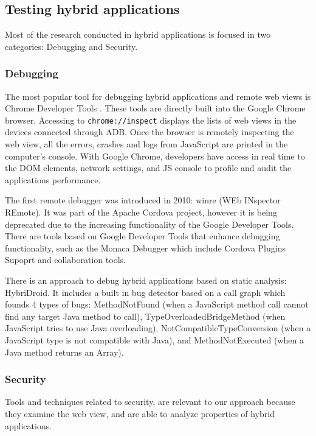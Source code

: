\subsection{Testing  hybrid applications}

Most of the research conducted in hybrid applications is focused in two categories: Debugging and Security.

\subsubsection{Debugging}

The most popular tool for debugging hybrid applications and remote web views is Chrome Developer Tools \cite{cdt}. These tools are directly built into the Google Chrome browser. Accessing to \texttt{chrome://inspect} displays the lists of web views in the devices connected through ADB. Once the browser is remotely inspecting the web view, all the errors, crashes and logs from JavaScript are printed in the computer's console. With Google Chrome, developers have access in real time to the DOM elements, network settings, and JS console to profile and audit the applications performance.

The first remote debugger was introduced in 2010: winre (WEb INspector REmote)\cite{weinre}. It was part of the Apache Cordova project, however it is being deprecated due to the increasing functionality of the Google Developer Tools. There are tools based on Google Developer Tools that enhance debugging functionality, such as the Monaca Debugger\cite{monacaDebugger} which include Cordova Plugins Supoprt and collaboration tools.


There is an approach to debug hybrid applications based on static analysis: HybriDroid\cite{7582763}.  It includes a built in bug detector based on a call graph which founds 4 types of bugs: MethodNotFound (when a JavaScript method call cannot find any target Java method to call), TypeOverloadedBridgeMethod (when JavaScript tries to use Java overloading), NotCompatibleTypeConversion (when a JavaScript type is not compatible with Java), and MethodNotExecuted (when a Java method returns an Array)\cite{7582763}.

\subsubsection{Security}

Tools and techniques related to security, are relevant to our approach because they examine the web view, and are able to analyze properties of hybrid applications.


